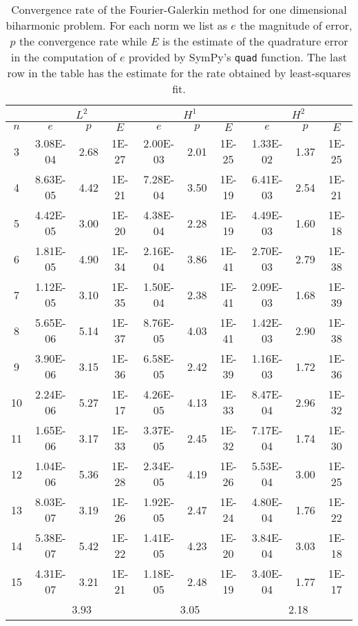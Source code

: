 \documentclass[a4paper,10pt]{article}
\begin{document}
  \begin{table}
    \centering
    \begin{tabular}{|c|c|c|c||c|c|c||c|c|c|}
    \hline
    & \multicolumn{3}{c||}{$L^2$} &
      \multicolumn{3}{c||}{$H^1$} &
      \multicolumn{3}{c|}{$H^2$}\\
    \hline
$n$ & $e$ & $p$ & $E$ & $e$ & $p$ & $E$ & $e$ & $p$ & $E$\\
\hline
3 & 3.08E-04 & 2.68 & 1E-27 & 2.00E-03 & 2.01 & 1E-25 & 1.33E-02 & 1.37 & 1E-25\\
4 & 8.63E-05 & 4.42 & 1E-21 & 7.28E-04 & 3.50 & 1E-19 & 6.41E-03 & 2.54 & 1E-21\\
5 & 4.42E-05 & 3.00 & 1E-20 & 4.38E-04 & 2.28 & 1E-19 & 4.49E-03 & 1.60 & 1E-18\\
6 & 1.81E-05 & 4.90 & 1E-34 & 2.16E-04 & 3.86 & 1E-41 & 2.70E-03 & 2.79 & 1E-38\\
7 & 1.12E-05 & 3.10 & 1E-35 & 1.50E-04 & 2.38 & 1E-41 & 2.09E-03 & 1.68 & 1E-39\\
8 & 5.65E-06 & 5.14 & 1E-37 & 8.76E-05 & 4.03 & 1E-41 & 1.42E-03 & 2.90 & 1E-38\\
9 & 3.90E-06 & 3.15 & 1E-36 & 6.58E-05 & 2.42 & 1E-39 & 1.16E-03 & 1.72 & 1E-36\\
10 & 2.24E-06 & 5.27 & 1E-17 & 4.26E-05 & 4.13 & 1E-33 & 8.47E-04 & 2.96 & 1E-32\\
11 & 1.65E-06 & 3.17 & 1E-33 & 3.37E-05 & 2.45 & 1E-32 & 7.17E-04 & 1.74 & 1E-30\\
12 & 1.04E-06 & 5.36 & 1E-28 & 2.34E-05 & 4.19 & 1E-26 & 5.53E-04 & 3.00 & 1E-25\\
13 & 8.03E-07 & 3.19 & 1E-26 & 1.92E-05 & 2.47 & 1E-24 & 4.80E-04 & 1.76 & 1E-22\\
14 & 5.38E-07 & 5.42 & 1E-22 & 1.41E-05 & 4.23 & 1E-20 & 3.84E-04 & 3.03 & 1E-18\\
15 & 4.31E-07 & 3.21 & 1E-21 & 1.18E-05 & 2.48 & 1E-19 & 3.40E-04 & 1.77 & 1E-17\\
\hline
    \hline
    & \multicolumn{3}{c||}{3.93} &
      \multicolumn{3}{c||}{3.05} &
      \multicolumn{3}{c|}{2.18}\\
    \hline
    \end{tabular}
    \label{tab:eig_b_1d}
    \caption{Convergence rate of the Fourier-Galerkin method for one dimensional
    biharmonic problem. For each norm we list as $e$ the magnitude of error,
    $p$ the convergence rate while $E$ is the estimate of the quadrature error
    in the computation of $e$ provided by SymPy's {\tt{quad}} function. The last
    row in the table has the estimate for the rate obtained by least-squares fit.}
  \end{table}
\end{document}
